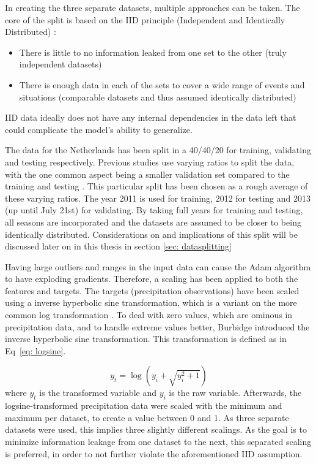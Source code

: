 \documentclass[twocolumn, 10pt, a4paper]{memoir}
\begin{document}
	In creating the three separate datasets, multiple approaches can be taken. The core of the split is based on the IID principle (Independent and Identically Distributed) \cite{Hampel1998}:
	
	\begin{itemize}
		\item There is little to no information leaked from one set to the other (truly independent datasets)
		\item There is enough data in each of the sets to cover a wide range of events and situations (comparable datasets and thus assumed identically distributed)
	\end{itemize}
	IID data ideally does not have any internal dependencies in the data left that could complicate the model's ability to generalize. 
	
	The data for the Netherlands has been split in a 40/40/20 for training, validating and testing respectively. Previous studies use varying ratios to split the data, with the one common aspect being a smaller validation set compared to the training and testing \cite{Polz2020,Diba2021,Pudashine2020}. This particular split has been chosen as a rough average of these varying ratios.
	The year 2011 is used for training, 2012 for testing and 2013 (up until July 21st) for validating. By taking full years for training and testing, all seasons are incorporated and the datasets are assumed to be closer to being identically distributed. Considerations on and implications of this split will be discussed later on in this thesis in section \ref{sec: datasplitting}
	
	Having large outliers and ranges in the input data can cause the Adam algorithm to have exploding gradients. Therefore, a scaling has been applied to both the features and targets. 
	The targets (precipitation observations) have been scaled using a inverse hyperbolic sine transformation, which is a variant on the more common log transformation \cite{Kilmartin1972}. To deal with zero values, which are ominous in precipitation data, and to handle extreme values better, Burbidge  introduced the inverse hyperbolic sine transformation. This transformation is defined as in Eq~\ref{eq: logsine}.
	
	\begin{equation}
		\label{eq: logsine}
		y_t = \log(y_i + \sqrt{y_i^2 + 1})
	\end{equation}
	where $y_t$ is the transformed variable and $y_i$ is the raw variable.
	Afterwards, the logsine-transformed precipitation data were scaled with the minimum and maximum per dataset, to create a value between 0 and 1. As three separate datasets were used, this implies three slightly different scalings. As the goal is to minimize information leakage from one dataset to the next, this separated scaling is preferred, in order to not further violate the aforementioned IID assumption.
	
\end{document}
